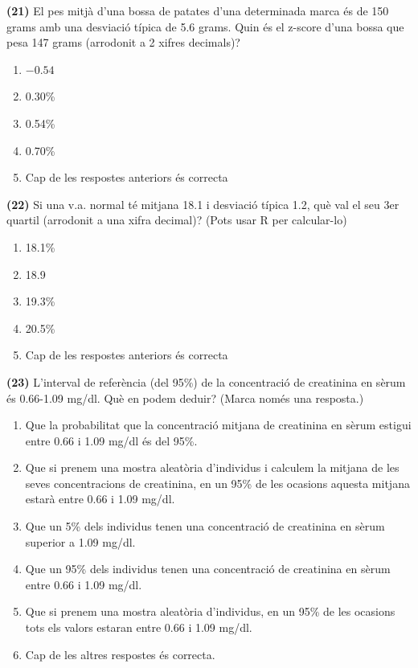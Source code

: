 \documentclass[
]{book}
\providecommand{\tightlist}{%
  \setlength{\itemsep}{0pt}\setlength{\parskip}{0pt}}
\theoremstyle{definition}
\theoremstyle{definition}
\theoremstyle{definition}
\theoremstyle{remark}
\begin{document}
\textbf{(21)} El pes mitjà d'una bossa de patates d'una determinada marca és de 150 grams amb una desviació típica de 5.6 grams. Quin és el z-score d'una bossa que pesa 147 grams (arrodonit a 2 xifres decimals)?

\begin{enumerate}
\def\labelenumi{\arabic{enumi}.}
\tightlist
\item
  \(-0.54\)
\item
  0.30\%
\item
  0.54\%
\item
  0.70\%
\item
  Cap de les respostes anteriors és correcta
\end{enumerate}

\textbf{(22)} Si una v.a. normal té mitjana 18.1 i desviació típica 1.2, què val el seu 3er quartil (arrodonit a una xifra decimal)? (Pots usar R per calcular-lo)

\begin{enumerate}
\def\labelenumi{\arabic{enumi}.}
\tightlist
\item
  18.1\%
\item
  18.9
\item
  19.3\%
\item
  20.5\%
\item
  Cap de les respostes anteriors és correcta
\end{enumerate}

\textbf{(23)} L'interval de referència (del 95\%) de la concentració de creatinina en sèrum és 0.66-1.09 mg/dl. Què en podem deduir? (Marca només una resposta.)

\begin{enumerate}
\def\labelenumi{\arabic{enumi}.}
\item
  Que la probabilitat que la concentració mitjana de creatinina en sèrum estigui entre 0.66 i 1.09 mg/dl és del 95\%.
\item
  Que si prenem una mostra aleatòria d'individus i calculem la mitjana de les seves concentracions de creatinina, en un 95\% de les ocasions aquesta mitjana estarà entre 0.66 i 1.09 mg/dl.
\item
  Que un 5\% dels individus tenen una concentració de creatinina en sèrum superior a 1.09 mg/dl.
\item
  Que un 95\% dels individus tenen una concentració de creatinina en sèrum entre 0.66 i 1.09 mg/dl.
\item
  Que si prenem una mostra aleatòria d'individus, en un 95\% de les ocasions tots els valors estaran entre 0.66 i 1.09 mg/dl.
\item
  Cap de les altres respostes és correcta.
\end{enumerate}
\end{document}
